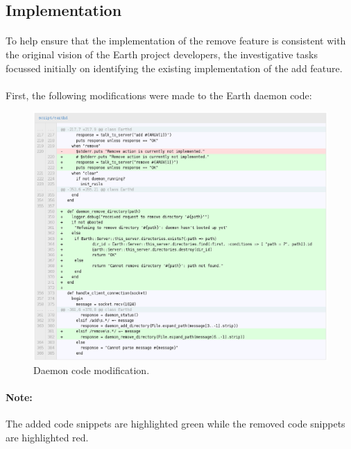 \documentclass[10pt,a4,oneside]{article}
\begin{document}
\newpage

\subsection*{Implementation}

\paragraph{}
To help ensure that the implementation of the remove feature is consistent 
with the original vision of the Earth project developers, the investigative 
tasks focussed initially on identifying the existing implementation of the 
add feature. 


\paragraph{}
First, the following modifications were made to the Earth daemon code:


\begin{figure}[h!]
\begin{centering}
\includegraphics[width=150mm]{figs/earthd}
\end{centering}
\caption{Daemon code modification.}
\label{fig:earthd}
\end{figure}


\paragraph{Note:}
The added code snippets are highlighted green while the removed code 
snippets are highlighted red.
\end{document}

